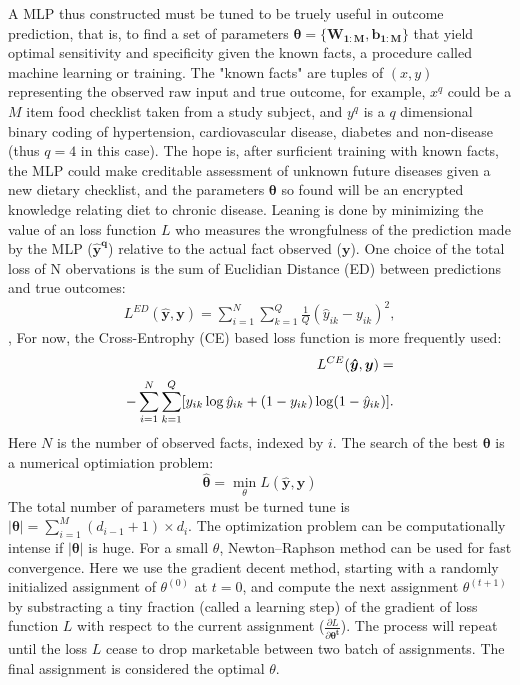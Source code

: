 \documentclass[twocolumn]{article}
\begin{document}
A MLP thus constructed must be tuned to be truely useful in outcome prediction, that is, to find a set of parameters $\boldsymbol{\theta}=\{\boldsymbol{W_{1:M}},\boldsymbol{b_{1:M}}\}$ that yield optimal sensitivity and specificity given the known facts, a procedure called machine learning or training. The "known facts" are tuples of $(x, y)$ representing the observed raw input and true outcome, for example, $x^q$ could be a $M$ item food checklist taken from a study subject, and $y^q$ is a $q$ dimensional binary coding of hypertension, cardiovascular disease, diabetes and non-disease (thus $q=4$ in this case). The hope is, after surficient training with known facts, the MLP could make creditable assessment of unknown future diseases given a new dietary checklist, and the parameters $\boldsymbol{\theta}$ so found will be an encrypted knowledge relating diet to chronic disease. Leaning is done by minimizing the value of an loss function $L$ who measures the wrongfulness of the prediction made by the MLP ($\boldsymbol{\hat{y}^q}$) relative to the actual fact observed ($\boldsymbol{y}$). 
One choice of the total loss of N obervations is the sum of Euclidian Distance (ED) between predictions and true outcomes:
\begin{equation*}
\begin{split}
  L^{ED}(\boldsymbol{\hat{y}},\boldsymbol{y}) = \sum_{i=1}^N\sum_{k=1}^Q\frac{1}{Q}(\hat{y}_{ik}-y_{ik})^2,
\end{split}
\end{equation*},
For now, the Cross-Entrophy (CE) based loss function is more frequently used:
\begin{equation*}
\begin{split}
\noindent L^{CE}(\boldsymbol{\hat{y}},\boldsymbol{y}) = \\
  -\sum_{i=1}^N\sum_{k=1}^Q[y_{ik}\log{\hat{y}_{ik}}+(1-y_{ik})\log(1-\hat{y}_{ik})].
\end{split}
\end{equation*}
Here $N$ is the number of observed facts, indexed by $i$. The search of the best $\boldsymbol{\theta}$ is a numerical optimiation problem:
\[\boldsymbol{\hat{\theta}}=\min_{\theta}L(\boldsymbol{\hat{y}},\boldsymbol{y})\]
The total number of parameters must be turned tune is $|\boldsymbol{\theta}|=\sum_{i=1}^{M}{(d_{i-1}+1) \times d_i}$. The optimization problem can be computationally intense if $|\boldsymbol{\theta}|$ is huge. For a small $\theta$, Newton–Raphson method can be used for fast convergence. Here we use the gradient decent method, starting with a randomly initialized assignment of $\theta^(0)$ at $t=0$, and compute the next assignment $\theta^{(t+1)}$ by substracting a tiny fraction (called a learning step) of the gradient of loss function $L$ with respect to the current assignment ($\frac{\partial L}{\partial \boldsymbol{\theta^{t}}}$). The process will repeat until the loss $L$ cease to drop marketable between two batch of assignments. The final assignment is considered the optimal $\theta$.
\end{document}
